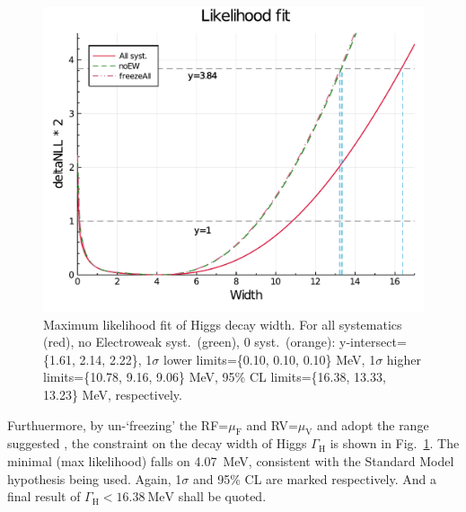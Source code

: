 \begin{figure}[h]
    \centering
    \includegraphics[width=.6\linewidth]{fig/Final_fit_width.pdf}
    \caption{Maximum likelihood fit of Higgs decay width. For all systematics (red), no Electroweak syst.~(green),
    0 syst.~(orange): y-intersect=\{1.61, 2.14, 2.22\}, 1$\sigma$ lower limits=\{0.10, 0.10, 0.10\} MeV,
1$\sigma$ higher limits=\{10.78, 9.16, 9.06\} MeV, 95\% CL limits=\{16.38, 13.33, 13.23\} MeV, respectively.}
\label{fig:final_fit_width}
\end{figure}
Furthuermore, by un-`freezing' the RF=$\mu_\mathrm{F}$ and RV=$\mu_\mathrm{V}$ and adopt the range suggested
\cite{HiggsPas}, the constraint on the decay width of Higgs $\Gamma_\mathrm{H}$ is shown in 
Fig.~\ref{fig:final_fit_width}. The minimal (max likelihood) falls on \SI{4.07}{\mega\electronvolt},
consistent with the Standard Model hypothesis being used. 
Again, 1$\sigma$ and 95\% CL are marked respectively. And a final result of 
$\Gamma_\mathrm{H}<\SI{16.38}{\mega\electronvolt}$ shall be quoted.




